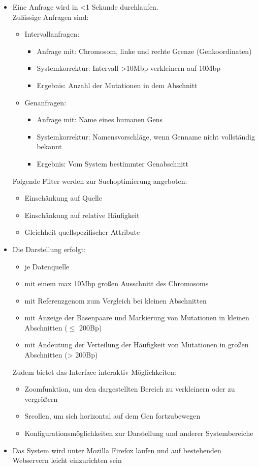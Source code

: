 \documentclass{scrartcl}
\begin{document}
\begin{itemize}
\item Eine Anfrage wird in <1 Sekunde durchlaufen.\\
Zulässige Anfragen sind:
\begin{itemize}
\item Intervallanfragen:
\begin{itemize}
\item Anfrage mit: Chromosom, linke und rechte Grenze (Genkoordinaten)
\item Systemkorrektur: Intervall >10Mbp verkleinern auf 10Mbp
\item Ergebnis: Anzahl der Mutationen in dem Abschnitt
\end{itemize}
\item Genanfragen:
\begin{itemize}
\item Anfrage mit: Name eines humanen Gens
\item Systemkorrektur: Namensvorschläge, wenn Genname nicht vollständig bekannt
\item Ergebnis: Vom System bestimmter Genabschnitt
\end{itemize} 
\end{itemize}
\newpage
Folgende Filter werden zur Suchoptimierung angeboten:
\begin{itemize}
\item Einschänkung auf Quelle
\item Einschänkung auf relative Häufigkeit
\item Gleichheit quellspezifischer Attribute
\end{itemize}

\item Die Darstellung erfolgt:
\begin{itemize}
\item je Datenquelle
\item mit einem max 10Mbp großen Ausschnitt des Chromosoms
\item mit Referenzgenom zum Vergleich bei kleinen Abschnitten
\item mit Anzeige der Basenpaare und Markierung von Mutationen in kleinen Abschnitten ($\leq$ 200Bp)
\item mit Andeutung der Verteilung der Häufigkeit von Mutationen in großen Abschnitten (> 200Bp)
\end{itemize}
Zudem bietet das Interface interaktiv Möglichkeiten:
\begin{itemize}
\item Zoomfunktion, um den dargestellten Bereich zu verkleinern oder zu vergrößern
\item Srcollen, um sich horizontal auf dem Gen fortzubewegen
\item Konfigurationsmöglichkeiten zur Darstellung und anderer Systembereiche
\end{itemize}

\item Das System wird unter Mozilla Firefox laufen und auf bestehenden Webservern leicht einzurichten sein
\end{itemize}
\end{document}
